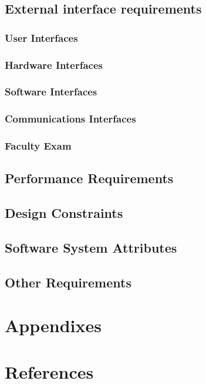 \documentclass{scrreprt}
\begin{document}
\section{External interface requirements}


\subsection{User Interfaces}

\subsection{Hardware Interfaces}


\subsection{Software Interfaces}


\subsection{Communications Interfaces}




\subsection{Faculty Exam}


\section{Performance Requirements}

\section{Design Constraints}


\section{Software System Attributes}


\section{Other Requirements}


\chapter{Appendixes}


\chapter{References}


\newpage
\printindex
\end{document}
